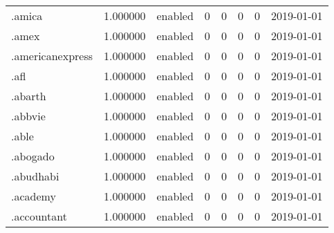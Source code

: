 \begin{tabular}{lrlrrrrl}
.amica                    &          1.000000 &         enabled &                           0 &                           0 &                           0 &                   0 &           2019-01-01 \\
.amex                     &          1.000000 &         enabled &                           0 &                           0 &                           0 &                   0 &           2019-01-01 \\
.americanexpress          &          1.000000 &         enabled &                           0 &                           0 &                           0 &                   0 &           2019-01-01 \\
.afl                      &          1.000000 &         enabled &                           0 &                           0 &                           0 &                   0 &           2019-01-01 \\
.abarth                   &          1.000000 &         enabled &                           0 &                           0 &                           0 &                   0 &           2019-01-01 \\
.abbvie                   &          1.000000 &         enabled &                           0 &                           0 &                           0 &                   0 &           2019-01-01 \\
.able                     &          1.000000 &         enabled &                           0 &                           0 &                           0 &                   0 &           2019-01-01 \\
.abogado                  &          1.000000 &         enabled &                           0 &                           0 &                           0 &                   0 &           2019-01-01 \\
.abudhabi                 &          1.000000 &         enabled &                           0 &                           0 &                           0 &                   0 &           2019-01-01 \\
.academy                  &          1.000000 &         enabled &                           0 &                           0 &                           0 &                   0 &           2019-01-01 \\
.accountant               &          1.000000 &         enabled &                           0 &                           0 &                           0 &                   0 &           2019-01-01 \\

\end{tabular}
